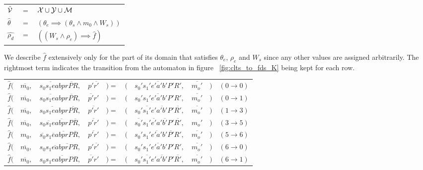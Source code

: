 \vspace{1em}
\begin{tabular}{ l c l }
	$\hat{{\mathcal{V}}}$ & $=$ & ${\mathcal{X}} \cup {\ensuremath{\mathcal{Y}}} \cup \mathcal{M}$\\	
	$\hat{\theta}$ & $=$ & $(\theta_e \implies (\theta_s \wedge m_0 \wedge W_s))$\\
	$\hat{\rho_d}$ & $=$ & $((W_s \wedge \rho_e) \implies \hat{f})$\\	
\end{tabular}
\vspace{1em}

We describe $\hat{f}$ extensively only for the part of its domain that satisfies $\theta_e$, $\rho_e$ and $W_s$ since any other values are assigned arbitrarily. The rightmost term indicates the transition from the automaton in figure ~\ref{fig:clts_to_fds_K} being kept for each row.

\vspace{1em}
\begin{tabular}{ r r r l l r r l l r}
	$\hat{f}($ & $\overline{m_0},$ & $\overline{s_0 s_1 e a b}p\overline{rPR},$ &$p'\overline{r'}$ & $) =$ & $($ & $\overline{s_0's_1'e'a'b'P'R'},$ & $\overline{m_o'}$ & $)$ & $(0 \rightarrow 0)$\\
	$\hat{f}($ & $\overline{m_0},$ & $\overline{s_0 s_1 e a b}p\overline{rPR},$ &$\overline{p'}r'$ & $) =$ & $($ & $\overline{s_0's_1'e'a'b'P'R'},$ & $\overline{m_o'}$ & $)$ & $(0 \rightarrow 1)$\\
	$\hat{f}($ & $\overline{m_0},$ & $\overline{s_0 s_1 e a b p}r\overline{PR},$ &$\overline{p'r'}$ & $) =$ & $($ & $s_0'\overline{s_1'}e'\overline{a'b'}P'\overline{R'},$ & $\overline{m_o'}$ & $)$ & $(1 \rightarrow 3)$\\		
	$\hat{f}($ & $\overline{m_0},$ & $s_0\overline{ s_1} e \overline{a b p r}P\overline{R},$ &$\overline{p'r'}$ & $) =$ & $($ & $\overline{s_0'}s_1'\overline{e'}a'\overline{b'}P'\overline{R'},$ & $m_o'$ & $)$ & $(3 \rightarrow 5)$\\		
	$\hat{f}($ & $m_0,$ & $\overline{ s_0}s_1\overline{e} a \overline{b p r}P\overline{R},$ &$\overline{p'r'}$ & $) =$ & $($ & $s_0's_1'\overline{e'a'}b'\overline{P'}R',$ & $\overline{m_o'}$ & $)$ & $(5 \rightarrow 6)$\\			
	$\hat{f}($ & $\overline{m_0},$ & $s_0 s_1\overline{e a} b \overline{p r P}R,$ &$p'\overline{r'}$ & $) =$ & $($ & $\overline{s_0's_1'e'a'b'P'R'},$ & $\overline{m_o'}$ & $)$ & $(6 \rightarrow 0)$\\				
	$\hat{f}($ & $\overline{m_0},$ & $s_0 s_1\overline{e a b p r P}R,$ &$\overline{p'}r'$ & $) =$ & $($ & $s_0'\overline{s_1'}e'\overline{a'b'}P'\overline{R'},$ & $\overline{m_o'}$ & $)$ & $(6 \rightarrow 1)$\\					
\end{tabular}
\vspace{1em}



